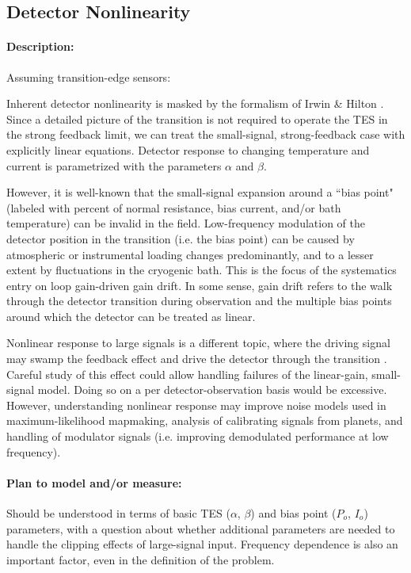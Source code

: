 \subsection{Detector Nonlinearity}
\label{det_nonlinearity}

\paragraph{Description:}
Assuming transition-edge sensors:

Inherent detector nonlinearity is masked by the formalism of Irwin \& Hilton \cite{TES_Bible}. Since a detailed picture of the transition is not required to operate the TES in the strong feedback limit, we can treat the small-signal, strong-feedback case with explicitly linear equations. Detector response to changing temperature and current is parametrized with the parameters $\alpha$ and $\beta$.

However, it is well-known that the small-signal expansion around a ``bias point" (labeled with percent of normal resistance, bias current, and/or bath temperature) can be invalid in the field. Low-frequency modulation of the detector position in the transition (i.e. the bias point) can be caused by atmospheric or instrumental loading changes predominantly, and to a lesser extent by fluctuations in the cryogenic bath. This is the focus of the systematics entry on loop gain-driven gain drift. In some sense, gain drift refers to the walk through the detector transition during observation and the multiple bias points around which the detector can be treated as linear.

Nonlinear response to large signals is a different topic, where the driving signal may swamp the feedback effect and drive the detector through the transition \cite{Rostem}. Careful study of this effect could allow handling failures of the linear-gain, small-signal model. Doing so on a per detector-observation basis would be excessive. However, understanding nonlinear response may improve noise models used in maximum-likelihood mapmaking, analysis of calibrating signals from planets, and handling of modulator signals (i.e. improving demodulated performance at low frequency).

\paragraph{Plan to model and/or measure:}

Should be understood in terms of basic TES ($\alpha$, $\beta$) and bias point ($P_o$, $I_o$) parameters, with a question about whether additional parameters are needed to handle the clipping effects of large-signal input. Frequency dependence is also an important factor, even in the definition of the problem.

